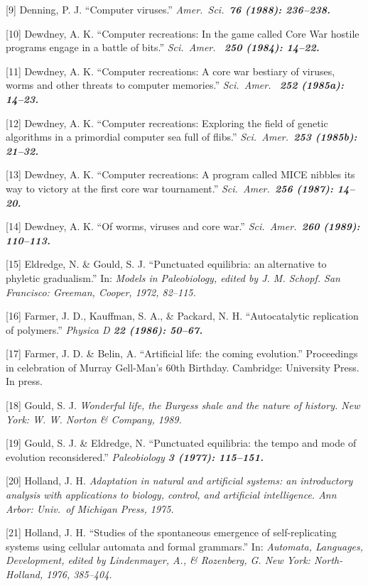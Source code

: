 [9] Denning, P. J.  ``Computer viruses.''  \it Amer.\ Sci.\ \bf 76 \rm
(1988): 236--238.

[10] Dewdney, A. K.  ``Computer recreations:  In the game called Core
War hostile programs engage in a battle of bits.''  \it Sci.\ Amer.\ \bf
250 \rm (1984): 14--22.

[11] Dewdney, A. K.  ``Computer recreations:  A core war bestiary of
viruses, worms and other threats to computer memories.''  \it Sci.\ Amer.\ \bf
252 \rm (1985a): 14--23.

[12] Dewdney, A. K.  ``Computer recreations:  Exploring the field of
genetic algorithms in a primordial computer sea full of flibs.''
\it Sci.\ Amer.\ \bf 253 \rm (1985b): 21--32.

[13] Dewdney, A. K.  ``Computer recreations:  A program called MICE
nibbles its way to victory at the first core war tournament.'' \it Sci.\
Amer.\ \bf 256 \rm (1987): 14--20.

[14] Dewdney, A. K.  ``Of worms, viruses and core war.''
\it Sci.\ Amer.\ \bf 260 \rm (1989): 110--113.

[15] Eldredge, N. \& Gould, S. J.  ``Punctuated equilibria: an alternative
to phyletic gradualism.''  In: \it Models in Paleobiology\rm , edited by
J. M. Schopf.  San Francisco: Greeman, Cooper, 1972, 82--115.

[16] Farmer, J. D., Kauffman, S. A., \& Packard, N. H.  ``Autocatalytic
replication of polymers.''  \it Physica D \bf 22 \rm (1986): 50--67.

[17] Farmer, J. D. \& Belin, A.  ``Artificial life: the
coming evolution.''  Proceedings in celebration of Murray Gell-Man's 60th
Birthday.  Cambridge: University Press.  In press.

[18] Gould, S. J.  \it Wonderful life, the Burgess shale and the nature
of history\rm .  New York: W. W. Norton \& Company, 1989.

[19] Gould, S. J. \& Eldredge, N.  ``Punctuated equilibria: the tempo and
mode of evolution reconsidered.''  \it Paleobiology \bf 3 \rm (1977): 115--151.

[20] Holland, J. H.  \it Adaptation in natural and artificial systems:
an introductory analysis with applications to biology, control, and
artificial intelligence\rm .  Ann Arbor: Univ.\ of Michigan Press, 1975.

[21] Holland, J. H.  ``Studies of the spontaneous emergence of
self-replicating systems using cellular automata and formal grammars.''
In: \it Automata, Languages, Development\rm , edited by Lindenmayer, A.,
\& Rozenberg, G.  New York: North-Holland, 1976, 385--404.

